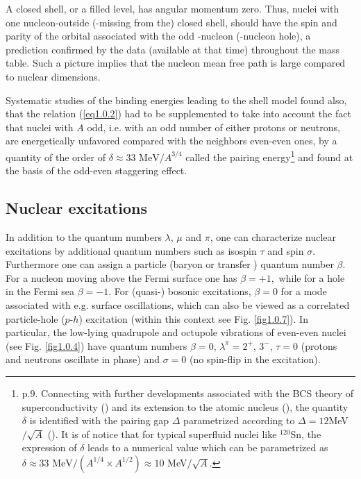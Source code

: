 A closed shell, or a filled level, has angular momentum zero. Thus, nuclei with one nucleon-outside (-missing from the) closed shell, should have the spin and parity of the orbital associated with the odd -nucleon (-nucleon hole), a prediction confirmed by the data (available at that time) throughout the mass table. Such a picture implies that the nucleon mean free path is large compared to nuclear dimensions.


Systematic studies of the binding energies leading to the shell model found also, that the relation (\ref{eq1.0.2}) had to be supplemented to take into account the fact that nuclei with $A$ odd,  i.e. with an odd number of either protons or neutrons, are energetically unfavored compared with the neighbors even-even ones, by a quantity of the order of $\delta\approx33\text{ MeV}/A^{3/4}$ called the pairing energy\footnote{\label{foot2} \cite{Mayer:55} p.9. Connecting with further developments associated with the BCS theory of superconductivity (\cite{Bardeen:57a,Bardeen:57b}) and its extension to the atomic nucleus (\cite{Bohr:58}), the quantity $\delta$ is identified with the pairing gap $\Delta$ parametrized according to $\Delta=12 $MeV$/\sqrt{A}$ (\cite{Bohr:69}). It is of notice that for typical superfluid nuclei like $^{120}$Sn, the expression of $\delta$ leads to a numerical value which can be parametrized as  $\delta\approx33\text{ MeV}/(A^{1/4}\times A^{1/2})\approx10$ MeV$/\sqrt{A}$.} and found at the basis of the odd-even staggering effect.

\subsection{Nuclear excitations}\label{S1.1.2}
In addition to the quantum numbers $\lambda$,  $\mu$ and $\pi$, one can characterize nuclear excitations by additional quantum numbers such as isospin $\tau$ and spin $\sigma$. Furthermore one can assign a particle (baryon or transfer ) quantum number $\beta$. For a nucleon moving above the Fermi surface one has $\beta=+1,$ while for a hole in the Fermi sea $\beta=-1$. For (quasi-) bosonic excitations, $\beta=0$ for a mode associated with e.g. surface oscillations, which can also be viewed as a correlated particle-hole ($p$-$h$) excitation (within this context see Fig. \ref{fig1.0.7}). In particular, the low-lying quadrupole and octupole vibrations of even-even nuclei (see Fig. \ref{fig1.0.4}) have quantum numbers $\beta=0$, $\lambda^\pi=2^+$, $3^-$, $\tau=0$ (protons and neutrons oscillate in phase) and $\sigma=0$ (no spin-flip in the excitation).

